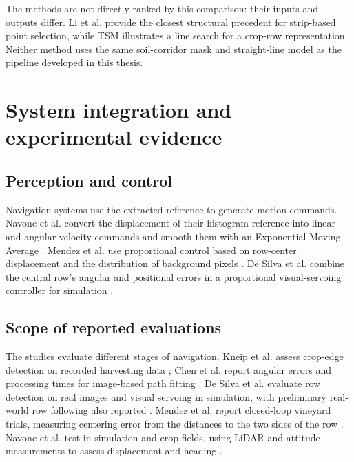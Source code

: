 The methods are not directly ranked by this comparison: their inputs
and outputs differ. Li et al. provide the closest structural precedent
for strip-based point selection, while TSM illustrates a line search
for a crop-row representation. Neither method uses the same
soil-corridor mask and straight-line model as the pipeline developed
in this thesis.

\section{System integration and experimental evidence}
\label{sec:sistemi_completi}

\subsection{Perception and control}
\label{subsec:architetture_percezione_controllo}

Navigation systems use the extracted reference to generate motion
commands. Navone et al. convert the displacement of their histogram
reference into linear and angular velocity commands and smooth them
with an Exponential Moving Average
\cite[Section~3.4]{navone2025gpsfree}. Mendez et al. use proportional
control based on row-center displacement and the distribution of
background pixels \cite[Section~3.5]{mendez2023vineyards}. De Silva et
al. combine the central row's angular and positional errors in a
proportional visual-servoing controller for simulation
\cite[Section~4.3]{silva2023rowdetection}.

\subsection{Scope of reported evaluations}
\label{subsec:validation_scope}

The studies evaluate different stages of navigation. Kneip et al.
assess crop-edge detection on recorded harvesting data
\cite[Section~8]{kneip2020cropedge}; Chen et al. report angular errors
and processing times for image-based path fitting
\cite[Section~3.6, Tables~6--7]{chen2021navigation}. De Silva et al.
evaluate row detection on real images and visual servoing in simulation,
with preliminary real-world row following also reported
\cite[Sections~5.2--5.3 and~6, Table~5]{silva2023rowdetection}.
Mendez et al. report closed-loop vineyard trials, measuring centering
error from the distances to the two sides of the row
\cite[Sections~3.6 and~4]{mendez2023vineyards}. Navone et al. test in
simulation and crop fields, using LiDAR and attitude measurements to
assess displacement and heading \cite[Sections~4.3--4.4]{navone2025gpsfree}.

